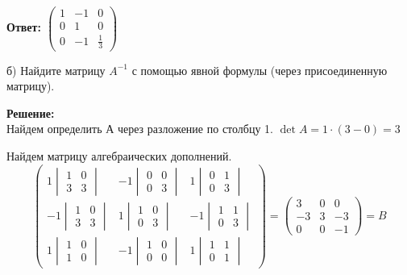 \documentclass[a4paper,12pt]{article}
\begin{document}
\begin{enumerate}
\textbf{Ответ: 
$\begin{pmatrix}
1&-1&0\\
0&1&0\\
0&-1&\frac{1}{3}
\end{pmatrix}$}

б) Найдите матрицу $A^{-1}$ с помощью явной формулы (через присоединенную матрицу).

\textbf{Решение:}\\
Найдем определить А через разложение по столбцу 1.
$\det A = 1  \cdot (3-0)=3$

Найдем матрицу алгебраических дополнений.
$$\begin{pmatrix}
1\begin{vmatrix}
1 & 0  \\ 
3 & 3 
\end{vmatrix}&-1\begin{vmatrix}
0 & 0  \\ 
0 & 3 
\end{vmatrix}&1\begin{vmatrix}
0 & 1  \\ 
0 & 3 
\end{vmatrix}\\
-1\begin{vmatrix}
1 & 0  \\ 
3 & 3 
\end{vmatrix}&1\begin{vmatrix}
1 & 0  \\ 
0 & 3 
\end{vmatrix}&-1\begin{vmatrix}
1 & 1  \\ 
0 & 3 
\end{vmatrix}\\
1\begin{vmatrix}
1 & 0  \\ 
1 & 0 
\end{vmatrix}&-1\begin{vmatrix}
1 & 0  \\ 
0 & 0 
\end{vmatrix}&1\begin{vmatrix}
1 & 1  \\ 
0 & 1 
\end{vmatrix}
\end{pmatrix}=\begin{pmatrix}
3&0&0\\
-3&3&-3\\
0&0&-1
\end{pmatrix}=B$$


\end{enumerate}
\end{document}
